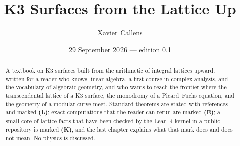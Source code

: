 \documentclass[11pt,oneside]{amsbook}
\title{K3 Surfaces from the Lattice Up}
\author{Xavier Callens}
\date{29 September 2026 --- edition 0.1}
\theoremstyle{plain}
\theoremstyle{definition}
\theoremstyle{remark}
\newcommand{\Lstatus}{\textbf{(L)}}
\newcommand{\Kstatus}{\textbf{(K)}}
\newcommand{\Estatus}{\textbf{(E)}}
\begin{document}
\frontmatter
\maketitle

\begin{abstract}
A textbook on K3 surfaces built from the arithmetic of integral lattices upward,
written for a reader who knows linear algebra, a first course in complex
analysis, and the vocabulary of algebraic geometry, and who wants to reach the
frontier where the transcendental lattice of a K3 surface, the monodromy of a
Picard--Fuchs equation, and the geometry of a modular curve meet. Standard
theorems are stated with references and marked \Lstatus; exact computations that
the reader can rerun are marked \Estatus; a small core of lattice facts that
have been checked by the Lean~4 kernel in a public repository is marked
\Kstatus, and the last chapter explains what that mark does and does not mean.
No physics is discussed.
\end{abstract}

\tableofcontents



\mainmatter










\appendix


\backmatter


\end{document}
